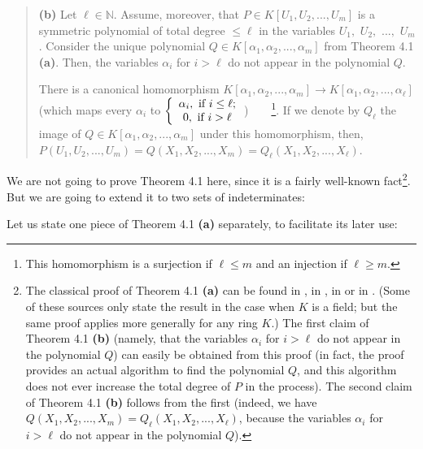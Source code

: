 \documentclass[numbers=enddot,12pt,final,onecolumn,notitlepage]{scrartcl}%
\begin{document}
\begin{quote}
\textbf{(b)} Let $\ell\in\mathbb{N}$. Assume, moreover, that $P\in K\left[
U_{1},U_{2},...,U_{m}\right]  $ is a symmetric polynomial of total degree
$\leq\ell$ in the variables $U_{1},$ $U_{2},$ $...,$ $U_{m}$. Consider the
unique polynomial $Q\in K\left[  \alpha_{1},\alpha_{2},...,\alpha_{m}\right]
$ from Theorem 4.1 \textbf{(a)}. Then, the variables $\alpha_{i}$ for $i>\ell$
do not appear in the polynomial $Q$.

There is a canonical homomorphism $K\left[  \alpha_{1},\alpha_{2}%
,...,\alpha_{m}\right]  \rightarrow K\left[  \alpha_{1},\alpha_{2}%
,...,\alpha_{\ell}\right]  $ (which maps every $\alpha_{i}$ to $\left\{
\begin{array}
[c]{c}%
\alpha_{i},\text{ if }i\leq\ell;\\
0,\text{ if }i>\ell
\end{array}
\right.  $)\ \ \ \ \footnote{This homomorphism is a surjection if $\ell\leq m$
and an injection if $\ell\geq m$.}. If we denote by $Q_{\ell}$ the image of
$Q\in K\left[  \alpha_{1},\alpha_{2},...,\alpha_{m}\right]  $ under this
homomorphism, then, $P\left(  U_{1},U_{2},...,U_{m}\right)  =Q\left(
X_{1},X_{2},...,X_{m}\right)  =Q_{\ell}\left(  X_{1},X_{2},...,X_{\ell
}\right)  $.
\end{quote}

We are not going to prove Theorem 4.1 here, since it is a fairly well-known
fact\footnote{The classical proof of Theorem 4.1 \textbf{(a)} can be found in
\cite[proof of Theorem 1]{BluCos16}, in \cite[Remark 4.16]{Neusel07}, in
\cite[\S 1.1]{Smith95} or in \cite[Chapter 7, \S 1, proof of Theorem
3]{CoLiOS15}. (Some of these sources only state the result in the case when
$K$ is a field; but the same proof applies more generally for any ring $K$.)
The first claim of Theorem 4.1 \textbf{(b)} (namely, that the variables
$\alpha_{i}$ for $i>\ell$ do not appear in the polynomial $Q$) can easily be
obtained from this proof (in fact, the proof provides an actual algorithm to
find the polynomial $Q$, and this algorithm does not ever increase the total
degree of $P$ in the process). The second claim of Theorem 4.1 \textbf{(b)}
follows from the first (indeed, we have $Q\left(  X_{1},X_{2},...,X_{m}%
\right)  =Q_{\ell}\left(  X_{1},X_{2},...,X_{\ell}\right)  $, because the
variables $\alpha_{i}$ for $i>\ell$ do not appear in the polynomial $Q$).}.
But we are going to extend it to two sets of indeterminates:

Let us state one piece of Theorem 4.1 \textbf{(a)} separately, to facilitate
its later use:
\end{document}

